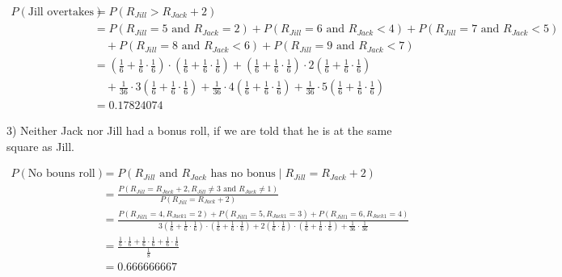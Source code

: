 \documentclass[11pt]{article}
\begin{document}
\begin{align*}
P(\text{Jill overtakes}) &= P(R_{Jill} > R_{Jack} + 2)\\
                         &= {P(R_{Jill} = 5 \text{ and } R_{Jack} = 2 ) + P(R_{Jill} = 6 \text{ and } R_{Jack} < 4 ) + P(R_{Jill} = 7 \text{ and } R_{Jack} < 5 )}\\
                            &\quad + P(R_{Jill} = 8 \text{ and } R_{Jack} < 6) + P(R_{Jill} = 9 \text{ and } R_{Jack} < 7)\\
                         &= (\frac{1}{6} + \frac{1}{6} \cdot \frac16) \cdot (\frac16 + \frac16 \cdot \frac16) + (\frac16 + \frac16 \cdot \frac16) \cdot 2(\frac16 + \frac16 \cdot \frac16)\\
                            &\quad + \frac{1}{36} \cdot 3(\frac16 + \frac16 \cdot \frac16) + \frac{1}{36} \cdot 4(\frac16 + \frac16 \cdot \frac16) + \frac{1}{36} \cdot 5(\frac16 + \frac16 \cdot \frac16)\\
                         &= 0.17824074
\end{align*}

3) Neither Jack nor Jill had a bonus roll, if we are told that he is at the same square as Jill.

\begin{align*}
P(\text{No bouns roll}) &= P(R_{Jill} \text{ and } R_{Jack} \text{ has no bonus} \;|\; R_{Jill} = R_{Jack} + 2)\\
                         &= \frac{P(R_{Jill} = R_{Jack} + 2, R_{Jill} \neq 3 \text{ and } R_{Jack} \neq 1)}{P(R_{Jill} = R_{Jack} + 2)}\\
                         &= \frac{P(R_{Jill1} = 4, R_{Jack1} = 2) + P(R_{Jill1} = 5, R_{Jack1} = 3) + P(R_{Jill1} = 6, R_{Jack1} = 4)}{3(\frac{1}{6} + \frac{1}{6} \cdot \frac16) \cdot (\frac16 + \frac16 \cdot \frac16) + 2(\frac{1}{6} \cdot \frac16) \cdot (\frac16 + \frac16 \cdot \frac16) + \frac{1}{36} \cdot \frac{1}{36}}\\
                         &= \frac{\frac16 \cdot \frac16 + \frac16 \cdot \frac16 + \frac16 \cdot \frac16}{\frac{1}{8}}\\
                         &= 0.666666667
\end{align*}
\end{document}
